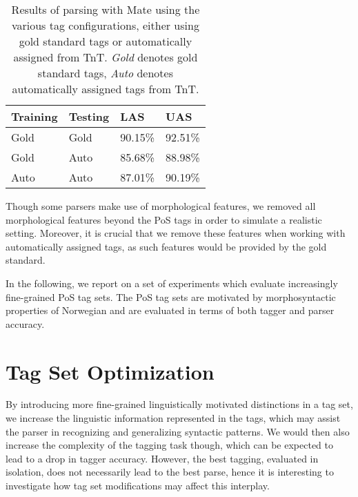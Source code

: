 \documentclass[11pt,a4paper]{article}
\begin{document}
\begin{table}
    \centering
    \smaller[0.5]
    \begin{tabular}{@{}llll@{}}
        \toprule
        \textbf{Training} & \textbf{Testing} & \textbf{LAS} & \textbf{UAS} \\
        \midrule
        Gold & Gold & 90.15\% & 92.51\% \\
        Gold & Auto & 85.68\% & 88.98\% \\
        Auto & Auto & 87.01\% & 90.19\% \\
        \bottomrule
    \end{tabular}
    \caption{Results of parsing with Mate using the various tag configurations,
        either using gold standard tags or automatically assigned from TnT.
        \emph{Gold} denotes gold standard tags, \emph{Auto} denotes
        automatically assigned tags from TnT.}
    \label{tagconfigeval}
\end{table}

Though some parsers make use of morphological features, %
we removed all morphological features beyond the PoS tags in order to simulate
a realistic setting.  Moreover, it is crucial that we remove these features
when working with automatically assigned tags, as such features would be
provided by the gold standard.


In the following, we report on a set of experiments which evaluate increasingly
fine-grained PoS tag sets. The PoS tag sets are motivated by morphosyntactic
properties of Norwegian and are evaluated in terms of both tagger and parser
accuracy.

\section{Tag Set Optimization}
\label{sec:optimization}
By introducing more fine-grained linguistically motivated distinctions in a tag
set, we increase the linguistic information represented in the tags, which may
assist the parser in recognizing and generalizing syntactic patterns.
We would then also increase the complexity of the tagging task though,
which can be expected to lead to a drop in tagger accuracy.
However, the best tagging, evaluated in isolation, does not necessarily lead to the
best parse, hence it is interesting to investigate how tag set modifications
may affect this interplay.
\end{document}
